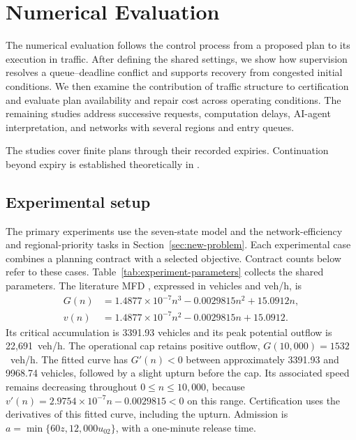 \section{Numerical Evaluation}
\label{sec:new-evidence}

The numerical evaluation follows the control process from a proposed plan
to its execution in traffic. After defining the shared settings, we show
how supervision resolves a queue--deadline conflict and supports recovery
from congested initial conditions. We then examine the contribution of
traffic structure to certification and evaluate plan availability and
repair cost across operating conditions. The remaining studies address
successive requests, computation delays, AI-agent interpretation, and
networks with several regions and entry queues.

The studies cover finite plans through their recorded expiries.
Continuation beyond expiry is established theoretically in
.


\subsection{Experimental setup}
\label{sec:experimental-setup}

The primary experiments use the seven-state model and the
network-efficiency and regional-priority tasks in
Section~\ref{sec:new-problem}. Each experimental case combines a planning
contract with a selected objective. Contract counts below refer to these
cases. Table~\ref{tab:experiment-parameters}
collects the shared parameters. The literature MFD
\cite{zhong2018robust}, expressed in vehicles and veh/h, is
\begin{equation}
\begin{aligned}
G(n)&=1.4877\times10^{-7}n^3-0.0029815n^2+15.0912n,\\
v(n)&=1.4877\times10^{-7}n^2-0.0029815n+15.0912.
\end{aligned}
\label{eq:new-mfd}
\end{equation}
Its critical accumulation is 3391.93 vehicles and its peak potential
outflow is 22,691~veh/h. The operational cap retains positive outflow,
$G(10{,}000)=1532$~veh/h. The fitted curve has $G'(n)<0$ between
approximately 3391.93 and 9968.74 vehicles, followed by a slight upturn
before the cap. Its associated speed remains decreasing throughout
$0\le n\le10{,}000$, because
$v'(n)=2.9754\times10^{-7}n-0.0029815<0$ on this range.
Certification uses the derivatives of this fitted curve, including the
upturn. Admission is
$a=\min\{60z,12{,}000u_{02}\}$, with a one-minute release time.

